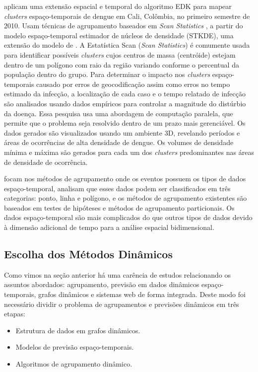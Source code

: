  aplicam uma extensão espacial e temporal do algoritmo \acrfull{EDK} para mapear \textit{clusters} espaço-temporais de dengue em Cali, Colômbia, no primeiro semestre de 2010. Usam técnicas de agrupamento baseados em \emph{Scan Statistics} \cite{Kulldorff1997}, a partir do modelo espaço-temporal estimador de núcleos de densidade (\acrshort{STKDE}), uma extensão do modelo de . A Estatística Scan (\emph{Scan Statistics}) é comumente usada para identificar possíveis \emph{clusters} cujos centros de massa (centróide) estejam dentro de um polígono com raio da região variando conforme o percentual da população dentro do grupo. Para determinar o impacto nos \textit{clusters} espaço-temporais causado por erros de geocodificação assim como erros no tempo estimado da infecção, a localização de cada caso e o tempo relatado de infecção são analisados usando dados empíricos para controlar a magnitude do distúrbio da doença. Essa pesquisa usa uma abordagem de computação paralela, que permite que o problema seja resolvido dentro de um prazo mais gerenciável. Os dados gerados são visualizados usando um ambiente 3D, revelando períodos e áreas de ocorrências de alta densidade de dengue. Os volumes de densidade mínima e máxima são gerados para cada um dos \textit{clusters} predominantes nas áreas de densidade de ocorrência.


 focam nos métodos de agrupamento onde os eventos possuem os tipos de dados espaço-temporal, analisam que esses dados podem ser classificados em três categorias: ponto, linha e polígono, e os métodos de agrupamento existentes são baseados em testes de hipóteses e métodos de agrupamento particionais. Os dados espaço-temporal são mais complicados do que outros tipos de dados devido à dimensão adicional de tempo para a análise espacial bidimensional.


\subsection{Escolha dos Métodos Dinâmicos}
\label{subsec:metodos-escolhidos}

Como vimos na seção anterior há uma carência de estudos relacionando os assuntos abordados: agrupamento, previsão em dados dinâmicos espaço-temporais, grafos dinâmicos e sistemas web de forma integrada. Deste modo foi necessário dividir o problema de agrupamentos e previsões dinâmicos em três etapas:
\begin{itemize}
\item Estrutura de dados em grafos dinâmicos.
\item Modelos de previsão espaço-temporais.
\item Algoritmos de agrupamento dinâmico.
\end{itemize}

